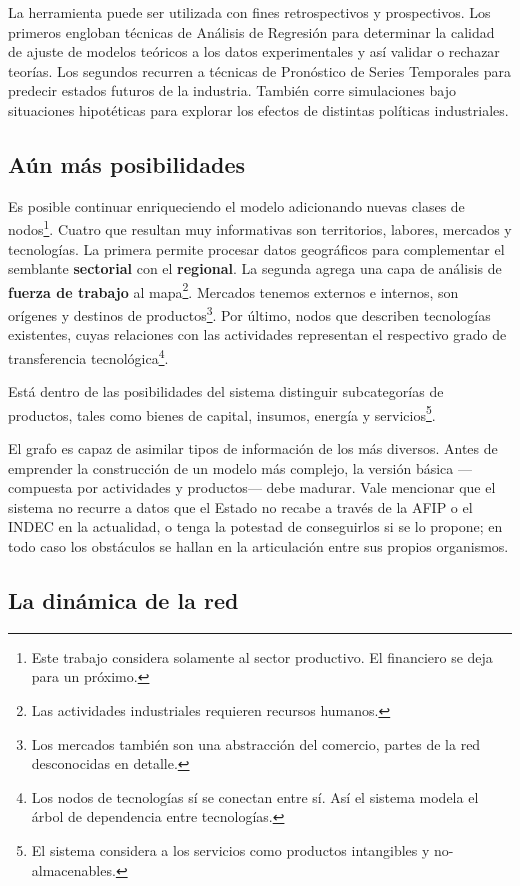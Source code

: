 \documentclass[a4paper]{report}
\begin{document}
La herramienta puede ser utilizada con fines retrospectivos y prospectivos. Los primeros engloban técnicas de Análisis de Regresión para determinar la calidad de ajuste de modelos teóricos a los datos experimentales y así validar o rechazar teorías. Los segundos recurren a técnicas de Pronóstico de Series Temporales para predecir estados futuros de la industria. También corre simulaciones bajo situaciones hipotéticas para explorar los efectos de distintas políticas industriales.

\subsection*{Aún más posibilidades}

Es posible continuar enriqueciendo el modelo adicionando nuevas clases de nodos\footnote{Este trabajo considera solamente al sector productivo. El financiero se deja para un próximo.}. Cuatro que resultan muy informativas son territorios, labores, mercados y tecnologías. La primera permite procesar datos geográficos para complementar el semblante \textbf{sectorial} con el \textbf{regional}. La segunda agrega una capa de análisis de \textbf{fuerza de trabajo} al mapa\footnote{Las actividades industriales requieren recursos humanos.}. Mercados tenemos externos e internos, son orígenes y destinos de productos\footnote{Los mercados también son una abstracción del comercio, partes de la red desconocidas en detalle.}. Por último, nodos que describen tecnologías existentes, cuyas relaciones con las actividades representan el respectivo grado de transferencia tecnológica\footnote{Los nodos de tecnologías sí se conectan entre sí. Así el sistema modela el árbol de dependencia entre tecnologías.}.

Está dentro de las posibilidades del sistema distinguir subcategorías de productos, tales como bienes de capital, insumos, energía y servicios\footnote{El sistema considera a los servicios como productos intangibles y no-almacenables.}.

El grafo es capaz de asimilar tipos de información de los más diversos. Antes de emprender la construcción de un modelo más complejo, la versión básica —compuesta por actividades y productos— debe madurar. Vale mencionar que el sistema no recurre a datos que el Estado no recabe a través de la AFIP o el INDEC en la actualidad, o tenga la potestad de conseguirlos si se lo propone; en todo caso los obstáculos se hallan en la articulación entre sus propios organismos.

\subsection*{La dinámica de la red}
\end{document}
